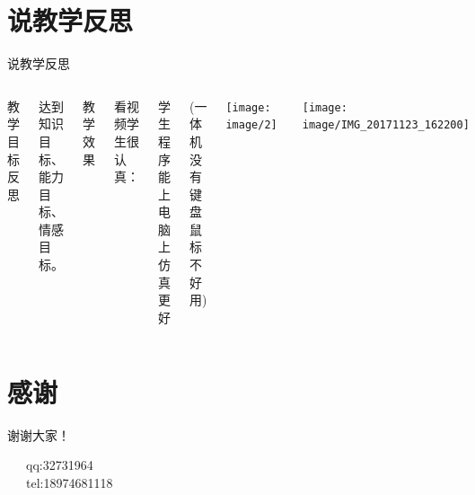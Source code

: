 \documentclass[utf8,zihao=-4,handout,smaller,aspectratio=1610]{ctexbeamer}
\begin{document}
\section{说教学反思}
\begin{frame}{说教学反思}
    \begin{columns}
        
        教学目标反思
          
          达到知识目标、能力目标、情感目标。
          
        教学效果
          
          看视频学生很认真：
                   		
          
          
          学生程序能上电脑上仿真更好
          
          (一体机没有键盘鼠标不好用)  
        
        
        \texttt{[image: image/2]}~
        

        \texttt{[image: image/IMG\_20171123\_162200]}
        
        
    \end{columns}

\end{frame}




\section*{感谢}
\begin{frame}[plain]
\vfill

\centering \huge 谢谢大家！

\vfill

\flushleft \footnotesize   
~~~qq:32731964\\
~~~tel:18974681118\\

\end{frame}
\end{document}
